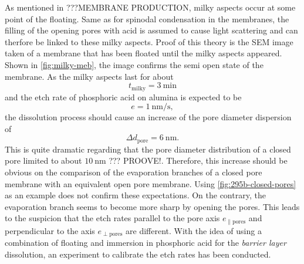\documentclass[../thesis.tex]{subfiles}
\begin{document}
        As mentioned in ???MEMBRANE PRODUCTION, milky aspects occur at some point of the floating. Same as for spinodal condensation in the membranes, the filling of the opening pores with acid is assumed to cause light scattering and can therfore be linked to these milky aspects. Proof of this theory is the SEM image taken of a membrane that has been floated until the milky aspects appeared. Shown in \cref{fig:milky-meb}, the image confirms the semi open state of the membrane. As the milky aspects last for about
        \begin{equation*}
          t_\mathrm{milky} =\SI{3}{\minute}
        \end{equation*}
        and the etch rate of phosphoric acid on alumina is expected to be
        \begin{equation*}
          e=\SI{1}{\nano\meter\per\second},
        \end{equation*}
        the  dissolution process should cause an increase of the pore diameter dispersion of
        \begin{equation*}
          \Delta d_\mathrm{pore} = \SI{6}{\nano\meter}.
        \end{equation*}
        This is quite dramatic regarding that the pore diameter distribution of a closed pore limited to about $\SI{10}{\nano\meter}$ ??? PROOVE!. Therefore, this increase should be obvious on the comparison of the evaporation branches of a closed pore membrane with an equivalent open pore membrane. Using \cref{fig:295b-closed-pores} as an example does not confirm these expectations. On the contrary, the evaporation branch seems to become more sharp by opening the pores. This leads to the suspicion that the etch rates parallel to the pore axis $e_\mathrm{\parallel pores}$ and perpendicular to the axis $e_\mathrm{\perp pores}$ are different. With the idea of using a combination of floating and immersion in phosphoric acid for the \textit{barrier layer} dissolution, an experiment to calibrate the etch rates has been conducted.
        \medskip
\end{document}
